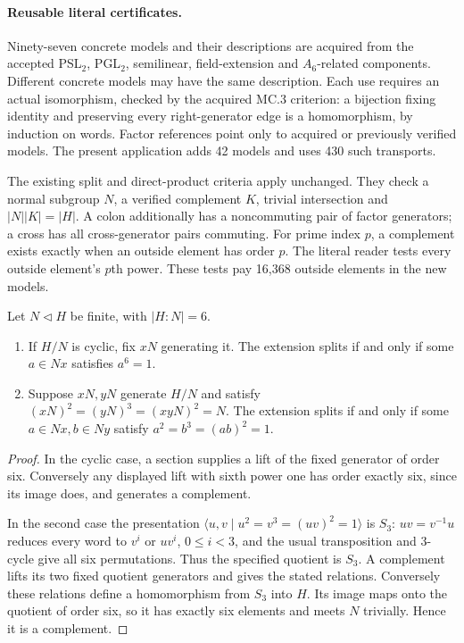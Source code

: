 \documentclass[11pt]{article}
\begin{document}
\paragraph{Reusable literal certificates.}
Ninety-seven concrete models and their descriptions are acquired from the
accepted PSL$_2$, PGL$_2$, semilinear, field-extension and $A_6$-related
components. Different concrete models may have the same description.
Each use requires an actual isomorphism, checked by the acquired MC.3
criterion: a bijection fixing identity and preserving every right-generator
edge is a homomorphism, by induction on words. Factor references point
only to acquired or previously verified models. The present application
adds 42 models and uses 430 such transports.

The existing split and direct-product criteria apply unchanged. They
check a normal subgroup $N$, a verified complement $K$, trivial
intersection and $|N||K|=|H|$. A colon additionally has a noncommuting
pair of factor generators; a cross has all cross-generator pairs commuting.
For prime index $p$, a complement exists exactly when an outside element
has order $p$. The literal reader tests every outside element's $p$th
power. These tests pay 16,368 outside elements in the new models.

\newpage
\begin{lemma}
Let $N\triangleleft H$ be finite, with $|H:N|=6$.
\begin{enumerate}
\item If $H/N$ is cyclic, fix $xN$ generating it. The extension splits
if and only if some $a\in Nx$ satisfies $a^6=1$.
\item Suppose $xN,yN$ generate $H/N$ and satisfy
$(xN)^2=(yN)^3=(xyN)^2=N$. The extension splits if and only if some
$a\in Nx,b\in Ny$ satisfy $a^2=b^3=(ab)^2=1$.
\end{enumerate}
\end{lemma}
\begin{proof}
In the cyclic case, a section supplies a lift of the fixed generator of
order six. Conversely any displayed lift with sixth power one has order
exactly six, since its image does, and generates a complement.

In the second case the presentation
$\langle u,v\mid u^2=v^3=(uv)^2=1\rangle$ is $S_3$:
$uv=v^{-1}u$ reduces every word to $v^i$ or $uv^i$, $0\leq i<3$,
and the usual transposition and 3-cycle give all six permutations.
Thus the specified quotient is $S_3$. A complement lifts its two fixed
quotient generators and gives the stated relations. Conversely these
relations define a homomorphism from $S_3$ into $H$. Its image maps onto
the quotient of order six, so it has exactly six elements and meets $N$
trivially. Hence it is a complement.
\end{proof}
\end{document}

